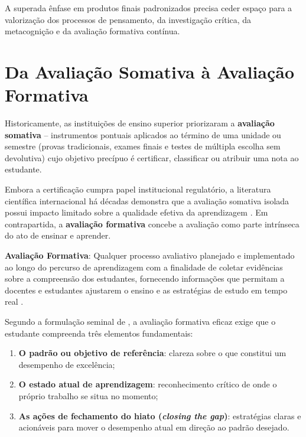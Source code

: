 A superada {\^e}nfase em produtos finais padronizados precisa ceder espa{\c c}o para a valoriza{\c c}{\~a}o dos processos de pensamento, da investiga{\c c}{\~a}o cr{\'i}tica, da metacogni{\c c}{\~a}o e da avalia{\c c}{\~a}o formativa cont{\'i}nua.

\section{Da Avalia{\c c}{\~a}o Somativa {\`a} Avalia{\c c}{\~a}o Formativa}

Historicamente, as institui{\c c}{\~o}es de ensino superior priorizaram a \textbf{avalia{\c c}{\~a}o somativa} -- instrumentos pontuais aplicados ao t{\'e}rmino de uma unidade ou semestre (provas tradicionais, exames finais e testes de m{\'u}ltipla escolha sem devolutiva) cujo objetivo prec{\'i}puo {\'e} certificar, classificar ou atribuir uma nota ao estudante. 

Embora a certifica{\c c}{\~a}o cumpra papel institucional regulat{\'o}rio, a literatura cient{\'i}fica internacional h{\'a} d{\'e}cadas demonstra que a avalia{\c c}{\~a}o somativa isolada possui impacto limitado sobre a qualidade efetiva da aprendizagem \cite{black1998assessment}. Em contrapartida, a \textbf{avalia{\c c}{\~a}o formativa} concebe a avalia{\c c}{\~a}o como parte intr{\'i}nseca do ato de ensinar e aprender. 

\begin{conceitochave}
\textbf{Avalia{\c c}{\~a}o Formativa}: Qualquer processo avaliativo planejado e implementado ao longo do percurso de aprendizagem com a finalidade de coletar evid{\^e}ncias sobre a compreens{\~a}o dos estudantes, fornecendo informa{\c c}{\~o}es que permitam a docentes e estudantes ajustarem o ensino e as estrat{\'e}gias de estudo em tempo real \cite{black1998assessment}.
\end{conceitochave}

Segundo a formula{\c c}{\~a}o seminal de , a avalia{\c c}{\~a}o formativa eficaz exige que o estudante compreenda tr{\^e}s elementos fundamentais:
\begin{enumerate}
  \item \textbf{O padr{\~a}o ou objetivo de refer{\^e}ncia}: clareza sobre o que constitui um desempenho de excel{\^e}ncia;
  \item \textbf{O estado atual de aprendizagem}: reconhecimento cr{\'i}tico de onde o pr{\'o}prio trabalho se situa no momento;
  \item \textbf{As a{\c c}{\~o}es de fechamento do hiato (\emph{closing the gap})}: estrat{\'e}gias claras e acion{\'a}veis para mover o desempenho atual em dire{\c c}{\~a}o ao padr{\~a}o desejado.
\end{enumerate}

